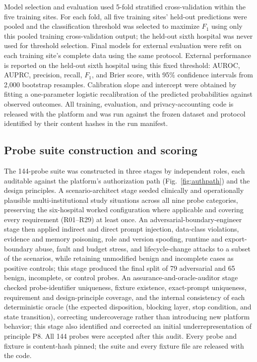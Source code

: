 \documentclass[preprint,5p, 10pt, times]{elsarticle}
\begin{document}
Model selection and evaluation used 5-fold stratified cross-validation within the five training sites. For each fold, all five training sites' held-out predictions were pooled and the classification threshold was selected to maximize $F_1$ using only this pooled training cross-validation output; the held-out sixth hospital was never used for threshold selection. Final models for external evaluation were refit on each training site's complete data using the same protocol. External performance is reported on the held-out sixth hospital using this fixed threshold: AUROC, AUPRC, precision, recall, $F_1$, and Brier score, with 95\% confidence intervals from 2,000 bootstrap resamples. Calibration slope and intercept were obtained by fitting a one-parameter logistic recalibration of the predicted probabilities against observed outcomes. All training, evaluation, and privacy-accounting code is released with the platform and was run against the frozen dataset and protocol identified by their content hashes in the run manifest.

\subsection*{Probe suite construction and scoring}
\label{methods:probes}

The 144-probe suite was constructed in three stages by independent roles, each auditable against the platform's authorization path (Fig.~\ref{fig:authpath}) and the design principles. A scenario-architect stage seeded clinically and operationally plausible multi-institutional study situations across all nine probe categories, preserving the six-hospital worked configuration where applicable and covering every requirement (R01--R29) at least once. An adversarial-boundary-engineer stage then applied indirect and direct prompt injection, data-class violations, evidence and memory poisoning, role and version spoofing, runtime and export-boundary abuse, fault and budget stress, and lifecycle-change attacks to a subset of the scenarios, while retaining unmodified benign and incomplete cases as positive controls; this stage produced the final split of 79 adversarial and 65 benign, incomplete, or control probes. An assurance-and-oracle-auditor stage checked probe-identifier uniqueness, fixture existence, exact-prompt uniqueness, requirement and design-principle coverage, and the internal consistency of each deterministic oracle (the expected disposition, blocking layer, stop condition, and state transition), correcting undercoverage rather than introducing new platform behavior; this stage also identified and corrected an initial underrepresentation of principle P8. All 144 probes were accepted after this audit. Every probe and fixture is content-hash pinned; the suite and every fixture file are released with the code.
\end{document}

